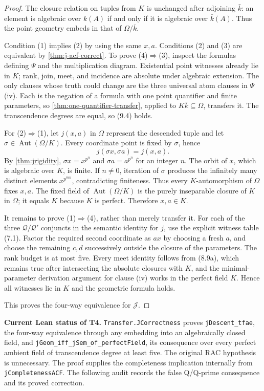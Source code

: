 \documentclass[11pt,oneside]{article}
\theoremstyle{definition}
\theoremstyle{remark}
\newcommand{\Aut}{\operatorname{Aut}}
\newcommand{\Qrel}{\mathcal{Q}}
\newcommand{\Qprel}{\mathcal{Q}'}
\newcommand{\Jrel}{\mathcal{J}}
\newcommand{\lean}[1]{\nolinkurl{#1}}
\begin{document}
\begin{proof}
The closure relation on tuples from $K$ is unchanged after adjoining $\bar k$: an element
is algebraic over $k(A)$ if and only if it is algebraic over $\bar k(A)$.  Thus the point
geometry embeds in that of $\Omega/\bar k$.

Condition (1) implies (2) by using the same $x,a$.  Conditions (2) and (3) are equivalent
by \cref{thm:j-acf-correct}.  To prove (4)$\Rightarrow$(3), inspect the formulas defining
$\Psi$ and the multiplication diagram.  Existential point witnesses already lie in $K$;
rank, join, meet, and incidence are absolute under algebraic extension.  The only clauses
whose truth could change are the three universal atom clauses in $\Psi$(iv).  Each is the
negation of a formula with one point quantifier and finite parameters, so
\cref{thm:one-quantifier-transfer}, applied to $K\bar k\subseteq\Omega$, transfers it.
The transcendence degrees are equal, so (9.4) holds.

For (2)$\Rightarrow$(1), let $j(x,a)$ in $\Omega$ represent the descended tuple and let
$\sigma\in\Aut(\Omega/K)$.  Every coordinate point is fixed by $\sigma$, hence
\[
 j(\sigma x,\sigma a)=j(x,a).
\]
By \cref{thm:jrigidity}, $\sigma x=x^{p^{n}}$ and
$\sigma a=a^{p^{n}}$ for an integer $n$.  The orbit of $x$, which is algebraic over $K$,
is finite.  If $n\neq0$, iteration of $\sigma$ produces the infinitely many distinct
elements $x^{p^{mn}}$, contradicting finiteness.  Thus every $K$-automorphism of
$\Omega$ fixes $x,a$.  The fixed field of $\Aut(\Omega/K)$ is the purely inseparable
closure of $K$ in $\Omega$; it equals $K$ because $K$ is perfect.  Therefore $x,a\in K$.

It remains to prove (1)$\Rightarrow$(4), rather than merely transfer it.  For each of the
three $\Qrel/\Qprel$ conjuncts in the semantic identity for $j$, use the explicit witness
table (7.1).  Factor the required second coordinate as $ax$ by choosing a fresh $a$, and
choose the remaining $c,d$ successively outside the closure of the parameters.  The rank
budget is at most five.  Every meet identity follows from (8.9a), which remains true after
intersecting the absolute closures with $K$, and the minimal-parameter derivation argument
for clause (iv) works in the perfect field $K$.  Hence all witnesses lie in $K$ and the
geometric formula holds.

This proves the four-way equivalence for $\Jrel$.
\end{proof}

\noindent\textbf{Current Lean status of T4.}
\lean{Transfer.JCorrectness} proves \lean{jDescent_tfae}, the four-way equivalence through
any embedding into an algebraically closed field, and
\lean{jGeom_iff_jSem_of_perfectField}, its consequence over every perfect ambient field
of transcendence degree at least five.  The original RAC hypothesis is unnecessary.
The proof supplies the completeness implication internally from \lean{jCompletenessACF}.
The following audit records the false Q/Q-prime consequence and its proved correction.
\end{document}
